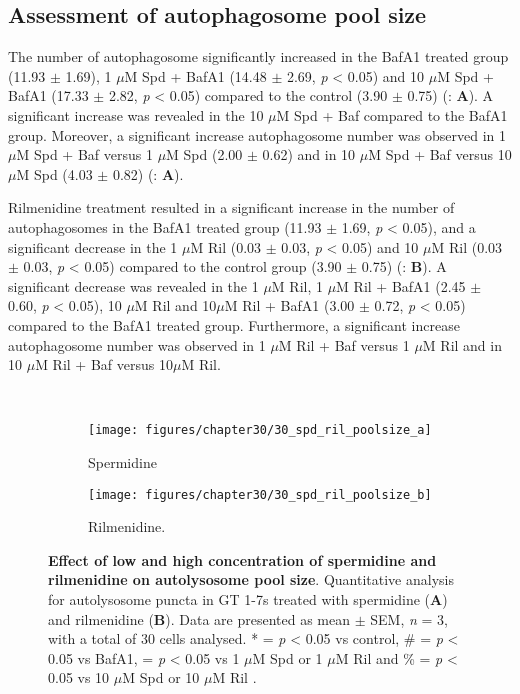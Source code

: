 {\subsection{Assessment of autophagosome pool size}
The number of autophagosome significantly increased in the BafA1 treated group (11.93  $\pm$ 1.69), 1 $\mu$M Spd + BafA1 (14.48 $\pm$ 2.69, \textit{p} < 0.05) and 10 $\mu$M Spd + BafA1 (17.33 $\pm$ 2.82, \textit{p} < 0.05) compared to the control (3.90 $\pm$ 0.75) (: \textbf{A}). A significant increase was revealed in the 10 $\mu$M Spd + Baf compared to the BafA1 group. Moreover, a significant increase autophagosome number was observed in 1 $\mu$M Spd + Baf versus 1 $\mu$M Spd (2.00 $\pm$ 0.62) and in 10 $\mu$M Spd + Baf versus 10 $\mu$M Spd (4.03 $\pm$ 0.82) (: \textbf{A}).

Rilmenidine treatment resulted in a significant increase in the number of autophagosomes in the BafA1 treated group (11.93 $\pm$ 1.69, \textit{p} < 0.05), and a significant decrease in the 1 $\mu$M Ril (0.03 $\pm$ 0.03, \textit{p} < 0.05) and 10 $\mu$M Ril (0.03 $\pm$ 0.03, \textit{p} < 0.05) compared to the control group (3.90 $\pm$ 0.75) (: \textbf{B}). A significant decrease was revealed in the 1 $\mu$M Ril, 1 $\mu$M Ril + BafA1 (2.45 $\pm$ 0.60, \textit{p} < 0.05), 10 $\mu$M Ril and 10$\mu$M Ril + BafA1 (3.00 $\pm$ 0.72, \textit{p} < 0.05) compared to the BafA1 treated group. Furthermore, a significant increase autophagosome number was observed in 1 $\mu$M Ril + Baf versus 1 $\mu$M Ril and in 10 $\mu$M Ril + Baf versus 10$\mu$M Ril.

\
\begin{figure}[!htbp]
  \begin{subfigure}[b]{0.495\linewidth}
    \texttt{[image: figures/chapter30/30\_spd\_ril\_poolsize\_a]}
    \caption{Spermidine}
  \end{subfigure}
  \begin{subfigure}[b]{0.495\linewidth}
    \texttt{[image: figures/chapter30/30\_spd\_ril\_poolsize\_b]}
    \caption{Rilmenidine.}
  \end{subfigure}
  \caption[Effect of a low and high concentration of spermidine and rilmenidine on autolysosome pool size]{\textbf{Effect of low and high concentration of spermidine and rilmenidine on autolysosome pool size}. Quantitative analysis for autolysosome puncta in GT 1-7s treated with spermidine (\textbf{A}) and rilmenidine (\textbf{B}). Data are presented as mean $\pm$ SEM, \textit{n} = 3, with a total of 30 cells analysed. * = \textit{p} < 0.05 vs control, \# = \textit{p} < 0.05 vs BafA1, \@ = \textit{p} < 0.05 vs 1 $\mu$M Spd or 1 $\mu$M Ril and \% = \textit{p} < 0.05 vs 10 $\mu$M Spd or 10 $\mu$M Ril .}
  \label{fig:30_spd_ril_poolsize1}
\end{figure}

}
